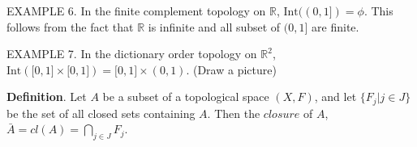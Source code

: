 \documentclass{article}
\begin{document}
  \noindent EXAMPLE 6. \quad In the finite complement topology on
  $\mathbb{R}$, $\mathrm{Int((0,1\rbrack)}=\phi$. This follows from
  the fact that $\mathbb{R}$ is infinite and all subset of
  $(0,1\rbrack$ are finite. \vspace{4mm}

  \noindent EXAMPLE 7. \quad In the dictionary order topology on
  $\mathbb{R}^2$, $\mathrm{Int(\lbrack 0,1 \rbrack \times
  \lbrack 0,1 \rbrack)} = \lbrack 0,1 \rbrack \times (0,1)$. (Draw a
  picture) \vspace{4mm}

  \noindent \textbf{Definition}. \quad Let $A$ be a subset of a
  topological space $(X,F)$, and let $\lbrace F_j|j \in J \rbrace$
  be the set of all closed sets containing $A$. Then the $closure$
  of $A$, $\bar{A} = cl(A) = \bigcap_{j \in J}F_j$.
\end{document}
